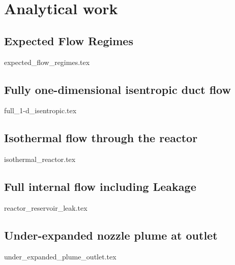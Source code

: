 \section{Analytical work}

\subsection{Expected Flow Regimes}
{expected_flow_regimes.tex}
\newpage

\subsection{Fully one-dimensional isentropic duct flow}
{full_1-d_isentropic.tex}
\newpage

\subsection{Isothermal flow through the reactor}
{isothermal_reactor.tex}
\newpage

\subsection{Full internal flow including Leakage}
{reactor_reservoir_leak.tex}
\newpage

\subsection{Under-expanded nozzle plume at outlet}
{under_expanded_plume_outlet.tex}
\newpage
